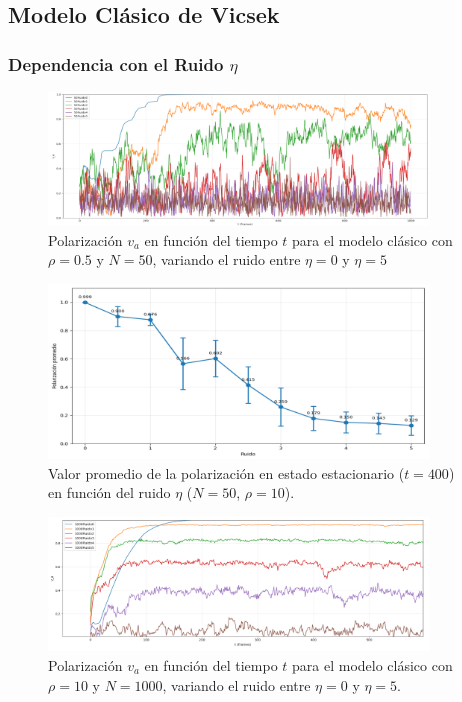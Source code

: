 \documentclass{article}
\begin{document}
\subsection{Modelo Clásico de Vicsek}

\subsubsection{Dependencia con el Ruido $\eta$}
\begin{figure}[H]
\centering
\includegraphics[width=0.9\textwidth]{polarizacion_vs_ruido_promedio.png}
\caption{Polarización $v_a$ en función del tiempo $t$ para el modelo clásico con $\rho = 0.5$ y $N = 50$, variando el ruido entre $\eta = 0$ y $\eta = 5$ }
\label{fig:va_vs_eta_promedio}
\end{figure}

\begin{figure}[H]
\centering
\includegraphics[width=0.9\textwidth]{polarizacion_vs_ruido_promedio2.png}
\caption{Valor promedio de la polarización en estado estacionario ($t=400$) en función del ruido $\eta$ ($N = 50$, $\rho = 10$).}
\label{fig:promedio_va_eta_promedio}
\end{figure}

\begin{figure}[H]
\centering
\includegraphics[width=0.9\textwidth]{promedio_polarizacion_ruido_promedio.png}
\caption{Polarización $v_a$ en función del tiempo $t$ para el modelo clásico con $\rho = 10$ y $N = 1000$, variando el ruido entre $\eta = 0$ y $\eta = 5$.}
\label{fig:va_vs_eta_promedio2}
\end{figure}
\end{document}
